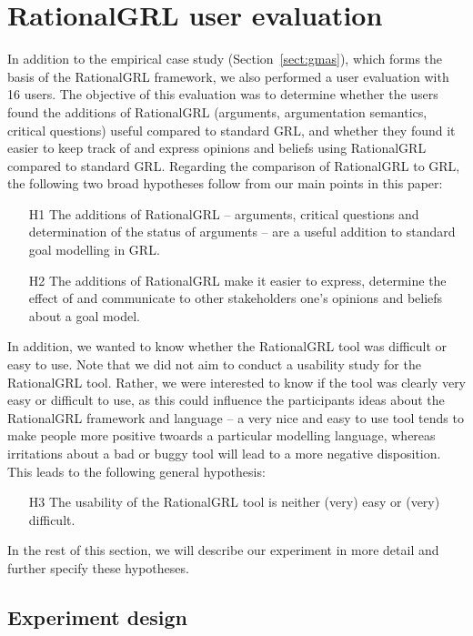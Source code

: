 \section{RationalGRL user evaluation}
\label{sect:validation}

In addition to the empirical case study (Section~\ref{sect:gmas}), which forms the basis of the RationalGRL framework, we also performed a user evaluation with 16 users. The objective of this evaluation was to determine whether the users found the additions of RationalGRL (arguments, argumentation semantics, critical questions) useful compared to standard GRL, and whether they found it easier to keep track of and express opinions and beliefs using RationalGRL compared to standard GRL. Regarding the comparison of RationalGRL to GRL, the following two broad hypotheses follow from our main points in this paper:

\begin{itemize}
\item[H1] The additions of RationalGRL -- arguments, critical questions and determination of the status of arguments -- are a useful addition to standard goal modelling in GRL.
\item[H2] The additions of RationalGRL make it easier to express, determine the effect of and communicate to other stakeholders one's opinions and beliefs about a goal model.
\end{itemize}

In addition, we wanted to know whether the RationalGRL tool was difficult or easy to use. Note that we did not aim to conduct a usability study for the RationalGRL tool. Rather, we were interested to know if the tool was clearly very easy or difficult to use, as this could influence the participants ideas about the RationalGRL framework and language -- a very nice and easy to use tool tends to make people more positive twoards a particular modelling language, whereas irritations about a bad or buggy tool will lead to a more negative disposition. This leads to the following general hypothesis:

\begin{itemize}
\item[H3] The usability of the RationalGRL tool is neither (very) easy or (very) difficult. 
\end{itemize}

In the rest of this section, we will describe our experiment in more detail and further specify these hypotheses.

\subsection{Experiment design}

